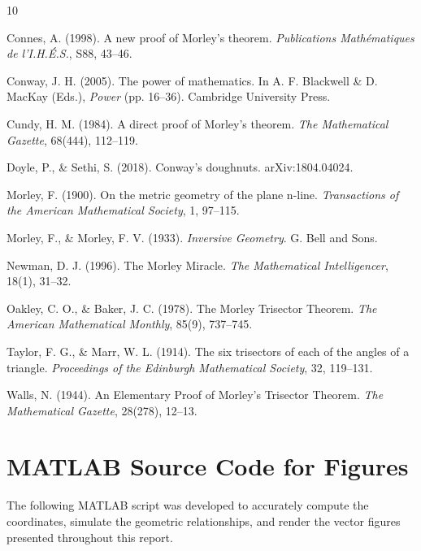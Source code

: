 \documentclass{amsart}
\begin{document}
	\vspace{1em}
	\begin{thebibliography}{10}
		
		Connes, A. (1998). A new proof of Morley's theorem. 
		\textit{Publications Math\'ematiques de l'I.H.\'E.S.}, S88, 43--46.
		
		Conway, J. H. (2005). The power of mathematics. 
		In A. F. Blackwell \& D. MacKay (Eds.), \textit{Power} (pp. 16--36). Cambridge University Press.
		
		Cundy, H. M. (1984). A direct proof of Morley's theorem. 
		\textit{The Mathematical Gazette}, 68(444), 112--119.
		
		Doyle, P., \& Sethi, S. (2018). Conway's doughnuts. 
		arXiv:1804.04024.
		
		Morley, F. (1900). On the metric geometry of the plane n-line. 
		\textit{Transactions of the American Mathematical Society}, 1, 97--115.
		
		Morley, F., \& Morley, F. V. (1933). \textit{Inversive Geometry}. 
		G. Bell and Sons.
		
		Newman, D. J. (1996). The Morley Miracle. 
		\textit{The Mathematical Intelligencer}, 18(1), 31--32.
		
		Oakley, C. O., \& Baker, J. C. (1978). The Morley Trisector Theorem. 
		\textit{The American Mathematical Monthly}, 85(9), 737--745.
		
		Taylor, F. G., \& Marr, W. L. (1914). The six trisectors of each of the angles of a triangle. 
		\textit{Proceedings of the Edinburgh Mathematical Society}, 32, 119--131.
		
		Walls, N. (1944). An Elementary Proof of Morley's Trisector Theorem. 
		\textit{The Mathematical Gazette}, 28(278), 12--13.
		
	\end{thebibliography}
	
	\newpage
	\appendix
	
	\section{MATLAB Source Code for Figures}
	The following MATLAB script was developed to accurately compute the coordinates, simulate the geometric relationships, and render the vector figures presented throughout this report.
	
\end{document}
